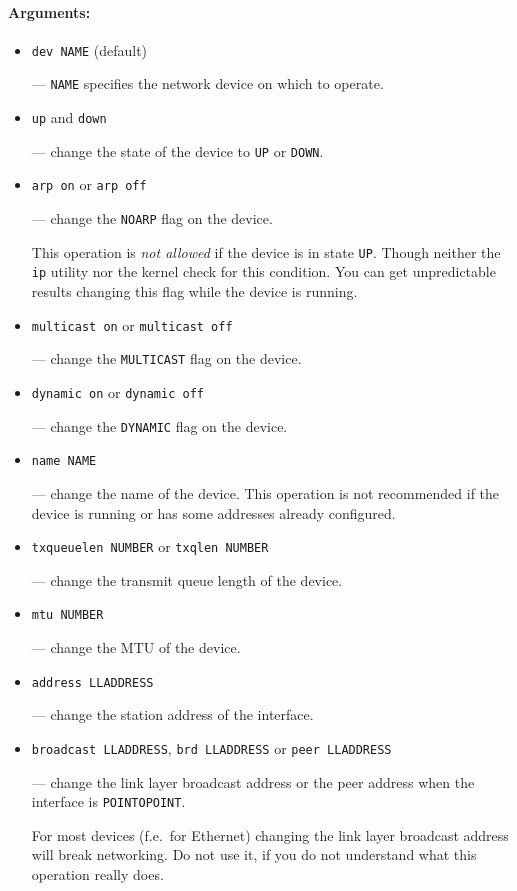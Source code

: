 \paragraph{Arguments:}

\begin{itemize}
\item \verb|dev NAME| (default)

--- \verb|NAME| specifies the network device on which to operate.

\item \verb|up| and \verb|down|

--- change the state of the device to \verb|UP| or \verb|DOWN|.

\item \verb|arp on| or \verb|arp off|

--- change the \verb|NOARP| flag on the device.

\begin{NB}
This operation is {\em not allowed\/} if the device is in state \verb|UP|.
Though neither the \verb|ip| utility nor the kernel check for this condition.
You can get unpredictable results changing this flag while the
device is running.
\end{NB}

\item \verb|multicast on| or \verb|multicast off|

--- change the \verb|MULTICAST| flag on the device.

\item \verb|dynamic on| or \verb|dynamic off|

--- change the \verb|DYNAMIC| flag on the device.

\item \verb|name NAME|

--- change the name of the device. This operation is not
recommended if the device is running or has some addresses
already configured.

\item \verb|txqueuelen NUMBER| or \verb|txqlen NUMBER|

--- change the transmit queue length of the device.

\item \verb|mtu NUMBER|

--- change the MTU of the device.

\item \verb|address LLADDRESS|

--- change the station address of the interface.

\item \verb|broadcast LLADDRESS|, \verb|brd LLADDRESS| or \verb|peer LLADDRESS|

--- change the link layer broadcast address or the peer address when
the interface is \verb|POINTOPOINT|.

\vskip 1mm
\begin{NB}
For most devices (f.e.\ for Ethernet) changing the link layer
broadcast address will break networking.
Do not use it, if you do not understand what this operation really does.
\end{NB}

\end{itemize}

